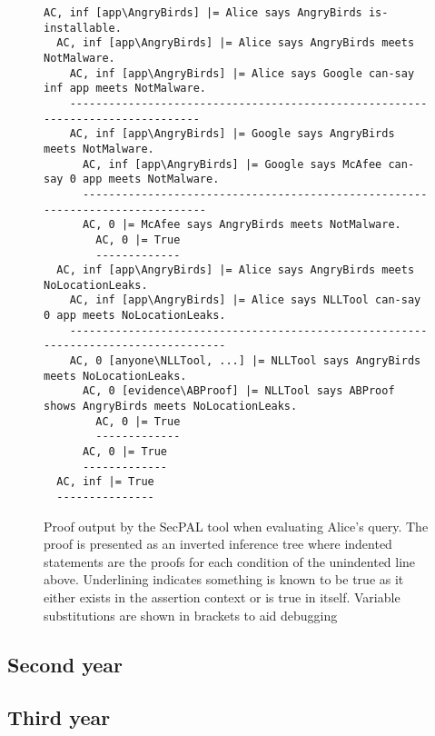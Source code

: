 \documentclass[report.tex]{subfiles}
\begin{document}
\begin{figure*}\label{secpal:exampleproof}
  \begin{lstlisting}[basicstyle=\footnotesize\ttfamily,columns=flexible,mathescape]
AC, inf [app\AngryBirds] |= Alice says AngryBirds is-installable.
  AC, inf [app\AngryBirds] |= Alice says AngryBirds meets NotMalware.
    AC, inf [app\AngryBirds] |= Alice says Google can-say inf app meets NotMalware.
    -------------------------------------------------------------------------------
    AC, inf [app\AngryBirds] |= Google says AngryBirds meets NotMalware.
      AC, inf [app\AngryBirds] |= Google says McAfee can-say 0 app meets NotMalware.
      ------------------------------------------------------------------------------
      AC, 0 |= McAfee says AngryBirds meets NotMalware.
        AC, 0 |= True
        -------------
  AC, inf [app\AngryBirds] |= Alice says AngryBirds meets NoLocationLeaks.
    AC, inf [app\AngryBirds] |= Alice says NLLTool can-say 0 app meets NoLocationLeaks.
    -----------------------------------------------------------------------------------
    AC, 0 [anyone\NLLTool, ...] |= NLLTool says AngryBirds meets NoLocationLeaks.
      AC, 0 [evidence\ABProof] |= NLLTool says ABProof shows AngryBirds meets NoLocationLeaks.
        AC, 0 |= True
        -------------
      AC, 0 |= True
      -------------
  AC, inf |= True
  ---------------
  \end{lstlisting}
  \caption{Proof output by the SecPAL tool when evaluating Alice's query.  The
    proof is presented as an inverted inference tree where indented statements
    are the proofs for each condition of the unindented line above.  Underlining
    indicates something is known to be true as it either exists in the assertion
    context or is true in itself. Variable substitutions are shown in brackets
    to aid debugging}
\end{figure*}

\subsection{Second year}


\subsection{Third year}
\end{document}
